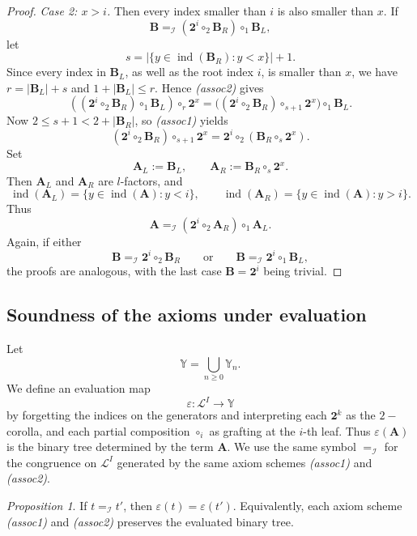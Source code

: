 \documentclass[a4paper]{article}
\theoremstyle{plain}
\theoremstyle{definition}
\theoremstyle{remark}
\numberwithin{equation}{section}
\renewcommand{\le}{\leqslant}\renewcommand{\ge}{\geqslant}
\newcommand{\Y}{\mathbb{Y}}
\newcommand{\eval}{\varepsilon}
\newtheorem{proposition}[theorem]{Proposition}
\begin{document}
\begin{proof}
\medskip
\noindent\emph{Case 2: \(x>i\).} Then every index smaller than \(i\) is also smaller than \(x\). If
\[
\mathbf B =_{\mathcal I} (\mathbf 2^{i}\circ_2 \mathbf B_R)\circ_1 \mathbf B_L,
\]
let
\[
s=\bigl|\{y\in\operatorname{ind}(\mathbf B_R):y<x\}\bigr|+1.
\]
Since every index in \(\mathbf B_L\), as well as the root index \(i\), is smaller than \(x\), we have $r=|\mathbf B_L|+s$ and $1+|\mathbf B_L|\le r$. Hence \emph{(assoc2)} gives
\[
((\mathbf 2^{i}\circ_2 \mathbf B_R)\circ_1 \mathbf B_L)\circ_r \mathbf 2^x
=
\bigl((\mathbf 2^{i}\circ_2 \mathbf B_R)\circ_{s+1}\mathbf 2^x\bigr)\circ_1 \mathbf B_L.
\]
Now \(2\le s+1<2+|\mathbf B_R|\), so \emph{(assoc1)} yields
\[
(\mathbf 2^{i}\circ_2 \mathbf B_R)\circ_{s+1}\mathbf 2^x
=
\mathbf 2^{i}\circ_2(\mathbf B_R\circ_s \mathbf 2^x).
\]
Set
\[
\mathbf A_L:=\mathbf B_L,
\qquad
\mathbf A_R:=\mathbf B_R\circ_s \mathbf 2^x.
\]
Then \(\mathbf A_L\) and \(\mathbf A_R\) are \(l\)-factors, and
\[
\operatorname{ind}(\mathbf A_L)=\{y\in\operatorname{ind}(\mathbf A):y<i\},
\qquad
\operatorname{ind}(\mathbf A_R)=\{y\in\operatorname{ind}(\mathbf A):y>i\}.
\]
Thus
\[
\mathbf A =_{\mathcal I} (\mathbf 2^{i}\circ_2 \mathbf A_R)\circ_1 \mathbf A_L.
\]
Again, if either
\[
\mathbf B =_{\mathcal I} \mathbf 2^{i}\circ_2 \mathbf B_R \qquad \text{or} \qquad \mathbf B =_{\mathcal I} \mathbf 2^{i}\circ_1 \mathbf B_L,
\]
the proofs are analogous, with the last case \(\mathbf B=\mathbf 2^{i}\) being trivial.

\end{proof}

\subsection{Soundness of the axioms under evaluation}\label{subsec:soundness-eval}

Let
\[
\Y=\bigcup_{n\ge 0}\Y_n.
\]
We define an evaluation map
\[
\eval:\mathcal L^I\to\Y
\]
by forgetting the indices on the generators and interpreting each \(\mathbf 2^k\) as the $2-$corolla, and each partial composition \(\circ_i\) as grafting at the \(i\)-th leaf. Thus \(\eval(\mathbf A)\) is the binary tree determined by the term \(\mathbf A\). We use the same symbol \(=_{\mathcal I}\) for the congruence on \(\mathcal L^I\)
generated by the same axiom schemes \emph{(assoc1)} and \emph{(assoc2)}.

\begin{proposition}\label{prop:eval-congruence}
If \(t =_{\mathcal I} t'\), then \(\eval(t)=\eval(t')\). Equivalently, each axiom scheme \emph{(assoc1)} and \emph{(assoc2)} preserves the evaluated binary tree.
\end{proposition}
\end{document}
